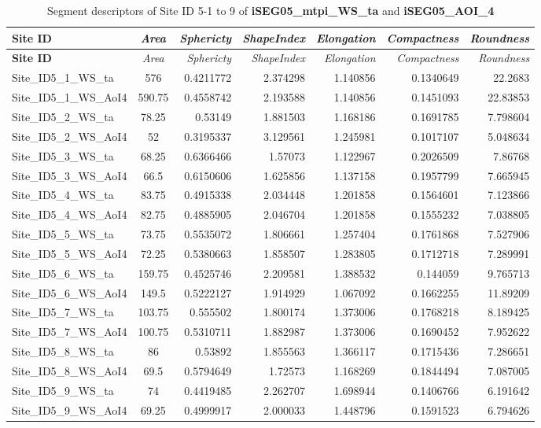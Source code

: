 \documentclass[
  12pt,
]{article}
\begin{document}
\begin{longtable}[]{@{}lcrrrrr@{}}
\caption{Segment descriptors of Site ID 5-1 to 9 of \textbf{iSEG05\_mtpi\_WS\_ta} and \textbf{iSEG05\_AOI\_4}}\tabularnewline
\toprule
\textbf{Site ID} & \emph{Area} & \emph{Sphericty} & \emph{ShapeIndex} & \emph{Elongation} & \emph{Compactness} & \emph{Roundness} \\
\midrule
\endfirsthead
\toprule
\textbf{Site ID} & \emph{Area} & \emph{Sphericty} & \emph{ShapeIndex} & \emph{Elongation} & \emph{Compactness} & \emph{Roundness} \\
\midrule
\endhead
Site\_ID5\_1\_WS\_ta & 576 & 0.4211772 & 2.374298 & 1.140856 & 0.1340649 & 22.2683 \\
Site\_ID5\_1\_WS\_AoI4 & 590.75 & 0.4558742 & 2.193588 & 1.140856 & 0.1451093 & 22.83853 \\
Site\_ID5\_2\_WS\_ta & 78.25 & 0.53149 & 1.881503 & 1.168186 & 0.1691785 & 7.798604 \\
Site\_ID5\_2\_WS\_AoI4 & 52 & 0.3195337 & 3.129561 & 1.245981 & 0.1017107 & 5.048634 \\
Site\_ID5\_3\_WS\_ta & 68.25 & 0.6366466 & 1.57073 & 1.122967 & 0.2026509 & 7.86768 \\
Site\_ID5\_3\_WS\_AoI4 & 66.5 & 0.6150606 & 1.625856 & 1.137158 & 0.1957799 & 7.665945 \\
Site\_ID5\_4\_WS\_ta & 83.75 & 0.4915338 & 2.034448 & 1.201858 & 0.1564601 & 7.123866 \\
Site\_ID5\_4\_WS\_AoI4 & 82.75 & 0.4885905 & 2.046704 & 1.201858 & 0.1555232 & 7.038805 \\
Site\_ID5\_5\_WS\_ta & 73.75 & 0.5535072 & 1.806661 & 1.257404 & 0.1761868 & 7.527906 \\
Site\_ID5\_5\_WS\_AoI4 & 72.25 & 0.5380663 & 1.858507 & 1.283805 & 0.1712718 & 7.289991 \\
Site\_ID5\_6\_WS\_ta & 159.75 & 0.4525746 & 2.209581 & 1.388532 & 0.144059 & 9.765713 \\
Site\_ID5\_6\_WS\_AoI4 & 149.5 & 0.5222127 & 1.914929 & 1.067092 & 0.1662255 & 11.89209 \\
Site\_ID5\_7\_WS\_ta & 103.75 & 0.555502 & 1.800174 & 1.373006 & 0.1768218 & 8.189425 \\
Site\_ID5\_7\_WS\_AoI4 & 100.75 & 0.5310711 & 1.882987 & 1.373006 & 0.1690452 & 7.952622 \\
Site\_ID5\_8\_WS\_ta & 86 & 0.53892 & 1.855563 & 1.366117 & 0.1715436 & 7.286651 \\
Site\_ID5\_8\_WS\_AoI4 & 69.5 & 0.5794649 & 1.72573 & 1.168269 & 0.1844494 & 7.087005 \\
Site\_ID5\_9\_WS\_ta & 74 & 0.4419485 & 2.262707 & 1.698944 & 0.1406766 & 6.191642 \\
Site\_ID5\_9\_WS\_AoI4 & 69.25 & 0.4999917 & 2.000033 & 1.448796 & 0.1591523 & 6.794626 \\
\bottomrule
\end{longtable}
\end{document}
